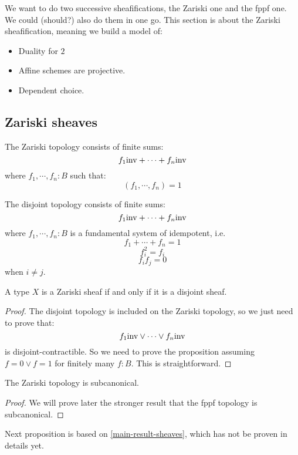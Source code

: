 We want to do two successive sheafifications, the Zariski one and the fppf one. We could (should?) also do them in one go. This section is about the Zariski sheafification, meaning we build a model of:

\begin{itemize}
\item Duality for $2$
\item Affine schemes are projective.
\item Dependent choice.
\end{itemize}


\subsection{Zariski sheaves}

\begin{definition}
The Zariski topology consists of finite sums:
\[f_1 \mathrm{inv} + \cdots + f_n \mathrm{inv}\]
where $f_1,\cdots,f_n:B$ such that:
\[(f_1,\cdots,f_n) = 1\]
\end{definition}

\begin{definition}
The disjoint topology consists of finite sums:
\[f_1 \mathrm{inv} + \cdots + f_n \mathrm{inv}\]
where $f_1,\cdots,f_n:B$ is a fundamental system of idempotent, i.e.
\[f_1+\cdots+f_n = 1\]
\[f_i^2 = f_i\]
\[f_if_j = 0\]
when $i\not=j$.
\end{definition}

\begin{lemma}
A type $X$ is a Zariski sheaf if and only if it is a disjoint sheaf.
\end{lemma}

\begin{proof}
The disjoint topology is included on the Zariski topology, so we just need to prove that:
\[f_1 \mathrm{inv} \lor \cdots \lor f_n \mathrm{inv}\]
is disjoint-contractible. So we need to prove the proposition assuming $f=0\lor f=1$ for finitely many $f:B$. This is straightforward.
\end{proof}

\begin{lemma}
The Zariski topology is subcanonical.
\end{lemma}

\begin{proof}
We will prove later the stronger result that the fppf topology is subcanonical.
\end{proof}

Next proposition is based on \cref{main-result-sheaves}, which has not be proven in details yet.

